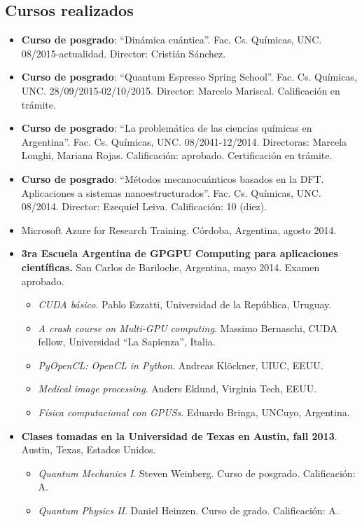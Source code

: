 \documentclass[10pt]{article}
\begin{document}
\subsection{Cursos realizados}
 \begin{itemize}
  \item {\bf Curso de posgrado}: ``Dinámica cuántica''. Fac. Cs. Químicas, UNC. 08/2015-actualidad. Director: Cristián Sánchez. 
  \item {\bf Curso de posgrado}: ``Quantum Espresso Spring School''. Fac. Cs. Químicas, UNC. 28/09/2015-02/10/2015. Director: Marcelo Mariscal. Calificación en trámite.
  \item {\bf Curso de posgrado}: ``La problemática de las ciencias químicas en Argentina''. Fac. Cs. Químicas, UNC. 08/2041-12/2014. Directoras: Marcela Longhi, Mariana Rojas. Calificación: aprobado. Certificación en trámite.
  \item {\bf Curso de posgrado}: ``Métodos mecanocuánticos basados en la DFT. Aplicaciones a sistemas nanoestructurados''. Fac. Cs. Químicas, UNC. 08/2014. Director: Ezequiel Leiva. Calificación: 10 (diez).
  \item {Microsoft Azure for Research Training.} Córdoba, Argentina, agosto 2014. 
  \item {\bf 3ra Escuela Argentina de GPGPU Computing para aplicaciones científicas.} San Carlos de Bariloche, Argentina, mayo 2014. Examen aprobado.
   \begin{itemize}
   \item {\it CUDA básico}. Pablo Ezzatti, Universidad de la República, Uruguay. 
   \item {\it A crash course on Multi-GPU computing}. Massimo Bernaschi, CUDA fellow, Universidad ``La Sapienza'', Italia.
   \item {\it PyOpenCL: OpenCL in Python}. Andreas Klöckner, UIUC, EEUU.
   \item {\it Medical image processing}. Anders Eklund, Virginia Tech, EEUU.
   \item {\it Física computacional con GPUSs}. Eduardo Bringa, UNCuyo, Argentina.
   \end{itemize}
  \item {\bf Clases tomadas en la Universidad de Texas en Austin, fall 2013}. Austin, Texas, Estados Unidos.
   \begin{itemize}
    \item {\it Quantum Mechanics I}. Steven Weinberg. Curso de posgrado. Calificación: A.
    \item {\it Quantum Physics II}. Daniel Heinzen. Curso de grado. Calificación: A.

\end{itemize}
\end{itemize}
\end{document}
